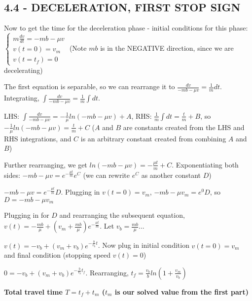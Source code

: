 \documentclass{article}
\begin{document}
\subsection{4.4 - DECELERATION, FIRST STOP SIGN}
\noindent Now to get the time for the deceleration phase - initial conditions for this phase: 
$\begin{cases}
    m \frac{dv}{dt} = -mb - \mu v \\
    v(t = 0) = v_{m} \\
    v(t = t_{f}) = 0
    \end{cases}$ (Note $mb$ is in the NEGATIVE direction, since we are decelerating) \par\vspace{0.25cm}
    
\noindent The first equation is separable, so we can rearrange it to $\frac{dv}{-mb - \mu v} = \frac{1}{m}dt$.  Integrating, $\int\frac{dv}{-mb - \mu v} = \frac{1}{m}\int dt$. \par
\noindent LHS: $\int\frac{dv}{-mb - \mu v} = -\frac{1}{\mu}ln(-mb - \mu v) + A$, RHS: $\frac{1}{m}\int dt = \frac{t}{m} + B$, so $-\frac{1}{\mu}ln(-mb - \mu v) = \frac{t}{m} + C$ ($A$ and $B$ are constants created from the LHS and RHS integrations, and $C$ is an arbitrary constant created from combining $A$ and $B$)\par
\noindent Further rearranging, we get $ln(-mb - \mu v) = -\frac{\mu t}{m} + C$.  Exponentiating both sides: $-mb - \mu v = e^{-\frac{\mu t}{m}}e^{C}$ (we can rewrite $e^{C}$ as another constant $D$) \par\vspace{0.25cm}

\noindent $-mb - \mu v = e^{-\frac{\mu t}{m}}D$.  Plugging in $v(t = 0) = v_{m}$, $-mb - \mu v_{m} = e^{0}D$, so $D = -mb - \mu v_{m}$ \par
\noindent Plugging in for $D$ and rearranging the subsequent equation, $v(t) = -\frac{mb}{\mu} + (v_{m} + \frac{mb}{\mu})e^{-\frac{\mu t}{m}}$.  Let $v_{b} = \frac{mb}{\mu}$... \par
\noindent $v(t) = -v_{b} + (v_{m} + v_{b})e^{-\frac{b}{v_{b}}t}$.  Now plug in initial condition $v(t = 0) = v_{m}$ and final condition (stopping speed $v(t) = 0$) \par
\noindent $0 = -v_{b} + (v_{m} + v_{b})e^{-\frac{b}{v_{b}}t_{f}}$.  Rearranging, $t_{f} = \frac{v_{b}}{b}ln(1 + \frac{v_{m}}{v_{b}})$

\noindent\textbf{Total travel time $T = t_{f} + t_{m}$ ($t_{m}$ is our solved value from the first part)}
\end{document}
